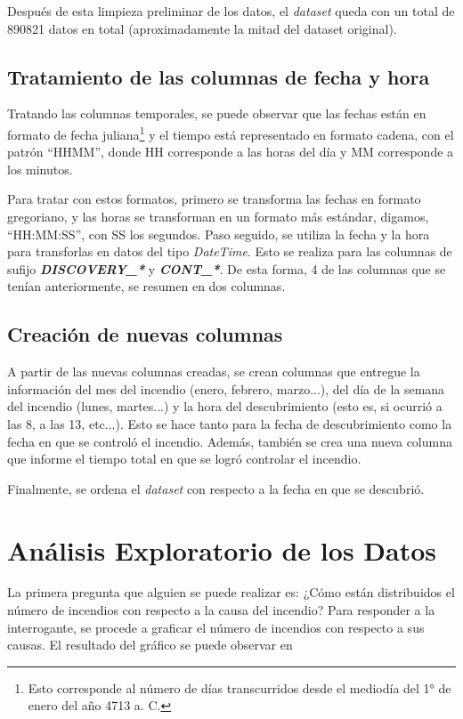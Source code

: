 Después de esta limpieza preliminar de los datos, el \textit{dataset} queda con un total de 890821 datos en total (aproximadamente la mitad del dataset original).

\subsection{Tratamiento de las columnas de fecha y hora}
Tratando las columnas temporales, se puede observar que las fechas están en formato de fecha juliana\footnote{Esto corresponde al número de días transcurridos desde el mediodía del 1° de enero del año 4713 a. C.} y el tiempo está representado en formato cadena, con el patrón ``HHMM'', donde HH corresponde a las horas del día y MM corresponde a los minutos. 

Para tratar con estos formatos, primero se transforma las fechas en formato gregoriano, y las horas se transforman en un formato más estándar, digamos, ``HH:MM:SS'', con SS los segundos. Paso seguido, se utiliza la fecha y la hora para transforlas en datos del tipo \textit{DateTime}. Esto se realiza para las columnas de sufijo \textit{\textbf{DISCOVERY\_*}} y \textit{\textbf{CONT\_*}}. De esta forma, 4 de las columnas que se tenían anteriormente, se resumen en dos columnas.

\subsection{Creación de nuevas columnas}
A partir de las nuevas columnas creadas, se crean columnas que entregue la información del mes del incendio (enero, febrero, marzo...), del día de la semana del incendio (lunes, martes...) y la hora del descubrimiento (esto es, si ocurrió a las 8, a las 13, etc...). Esto se hace tanto para la fecha de descubrimiento como la fecha en que se controló el incendio. Además, también se crea una nueva columna que informe el tiempo total en que se logró controlar el incendio. 

Finalmente, se ordena el \textit{dataset} con respecto a la fecha en que se descubrió.

\section{Análisis Exploratorio de los Datos}
La primera pregunta que alguien se puede realizar es: ¿Cómo están distribuidos el número de incendios con respecto a la causa del incendio? Para responder a la interrogante, se procede a graficar el número de incendios con respecto a sus causas. El resultado del gráfico se puede observar en

